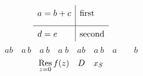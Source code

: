 \documentclass{article}
\begin{document}
\[\renewcommand{\arraystretch}{1.5}\begin{array}{r@{\;}c@{\;}l|l}a&=&b+c&\text{first}\\[6pt]\hline d&=&e&\text{second}\end{array}\]
\[ab\quad a\,b\quad a\:b\quad a\;b\quad a\!b\quad a\ b\quad a\qquad b\]
\[\mathop{\mathrm{Res}}_{z=0}f(z)\quad\mathchoice{D}{T}{S}{SS}\quad x_{\mathchoice{D}{T}{S}{SS}}\]
\end{document}
